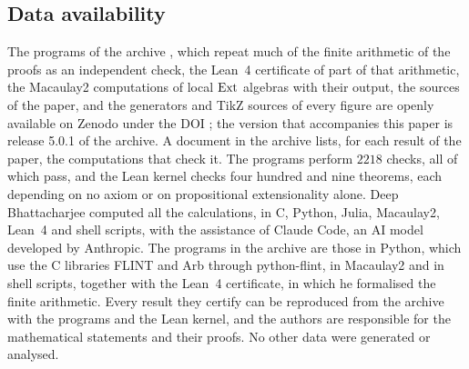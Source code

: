 \subsection*{Data availability}
The programs of the archive \cite{BMB26}, which repeat much of the finite
arithmetic of the proofs as an independent check, the Lean~4 certificate of
part of that arithmetic, the Macaulay2
computations of local $\operatorname{Ext}$ algebras with their output, the sources of the
paper, and the generators and TikZ sources of every figure are openly
available on Zenodo under the DOI \zenodoCodeDOI; the version that
accompanies this paper is release 5.0.1 of the archive. A document in the
archive lists, for each result of the paper, the computations that check
it. The programs perform $2218$ checks, all of which pass, and the
Lean kernel checks four hundred and nine theorems, each depending on no axiom
or on propositional extensionality alone. Deep Bhattacharjee computed all
the calculations, in C, Python, Julia, Macaulay2, Lean~4 and shell scripts,
with the assistance of Claude Code, an AI model developed by Anthropic. The
programs in the archive are those in Python, which use the C libraries FLINT
and Arb through python-flint, in Macaulay2 and in shell scripts, together
with the Lean~4 certificate, in which he formalised the finite arithmetic.
Every result they certify can be reproduced from the archive
with the programs and the Lean kernel, and the authors are responsible for
the mathematical statements and their proofs. No other data were generated
or analysed.
